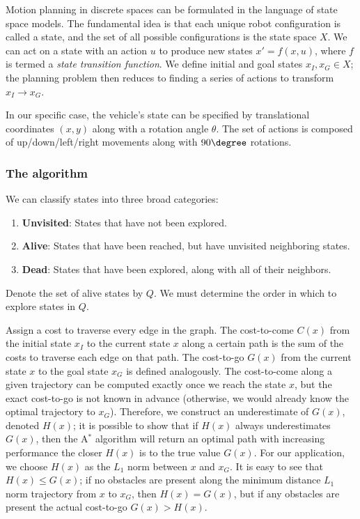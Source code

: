 \documentclass[10pt,letterpaper]{article}
\begin{document}
    Motion planning in discrete spaces can be formulated in the language of state space models. The fundamental idea is that each unique robot configuration is called a state, and the set of all possible configurations is the state space $X$. We can act on a state with an action $u$ to produce new states $x' = f(x,u)$, where $f$ is termed a \textit{state transition function}. We define initial and goal states $x_I, x_G \in X$; the planning problem then reduces to finding a series of actions to transform $x_I \rightarrow x_G$. 
    
    In our specific case, the vehicle's state can be specified by translational coordinates $(x,y)$ along with a rotation angle $\theta$. The set of actions is composed of up/down/left/right movements along with $90 \degree$ rotations.
    
    \subsubsection*{The algorithm}
    We can classify states into three broad categories:
    
    \begin{enumerate}
        \item \textbf{Unvisited}: States that have not been explored.
        \item \textbf{Alive}: States that have been reached, but have unvisited neighboring states.
        \item \textbf{Dead}: States that have been explored, along with all of their neighbors.
    \end{enumerate}
    
    Denote the set of alive states by $Q$. We must determine the order in which to explore states in $Q$. 
    
    Assign a cost to traverse every edge in the graph. The cost-to-come $C(x)$ from the initial state $x_I$ to the current state $x$ along a certain path is the sum of the costs to traverse each edge on that path. The cost-to-go $G(x)$ from the current state $x$ to the goal state $x_G$ is defined analogously. The cost-to-come along a given trajectory can be computed exactly once we reach the state $x$, but the exact cost-to-go is not known in advance (otherwise, we would already know the optimal trajectory to $x_G$). Therefore, we construct an underestimate of $G(x)$, denoted $H(x)$; it is possible to show that if $H(x)$ always underestimates $G(x)$, then the A$^*$ algorithm will return an optimal path with increasing performance the closer $H(x)$ is to the true value $G(x)$. For our application, we choose $H(x)$ as the $L_1$ norm between $x$ and $x_G$. It is easy to see that $H(x) \leq G(x)$; if no obstacles are present along the minimum distance $L_1$ norm trajectory from $x$ to $x_G$, then $H(x) = G(x)$, but if any obstacles are present the actual cost-to-go $G(x) > H(x)$. 
    
\end{document}
